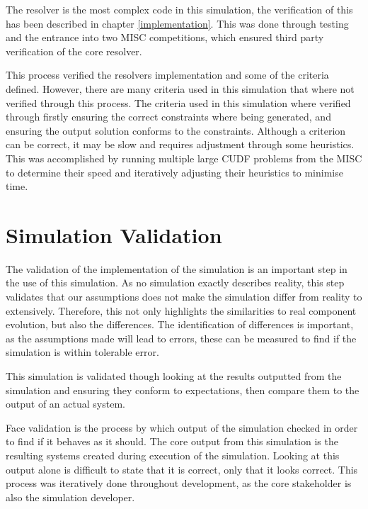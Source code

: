 The resolver is the most complex code in this simulation, the verification of this has been described in chapter \ref{implementation}.
This was done through testing and the entrance into two MISC competitions, which ensured third party verification of the core resolver.

This process verified the resolvers implementation and some of the criteria defined.
However, there are many criteria used in this simulation that where not verified through this process.
The criteria used in this simulation where verified through firstly ensuring the correct constraints where being generated, 
and ensuring the output solution conforms to the constraints.
Although a criterion can be correct, it may be slow and requires adjustment through some heuristics.
This was accomplished by running multiple large CUDF problems from the MISC to determine their speed and iteratively adjusting their heuristics to minimise time. 

\section{Simulation Validation}
The validation of the implementation of the simulation is an important step in the use of this simulation.
As no simulation exactly describes reality, this step validates that our assumptions does not make the simulation differ from reality to extensively.
Therefore, this not only highlights the similarities to real component evolution, but also the differences.
The identification of differences is important, as the assumptions made will lead to errors, these can be measured to find if the simulation is within tolerable error. 

This simulation is validated though looking at the results outputted from the simulation and ensuring they conform to expectations, 
then compare them to the output of an actual system.

Face validation is the process by which output of the simulation checked in order to find if it behaves as it should.
The core output from this simulation is the resulting systems created during execution of the simulation.
Looking at this output alone is difficult to state that it is correct, only that it looks correct.
This process was iteratively done throughout development, as the core stakeholder is also the simulation developer.

